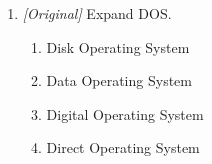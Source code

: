 \documentclass[11pt]{article}
\begin{document}
\begin{enumerate}[label=\textbf{Q\arabic*.}, leftmargin=*]
  correct?
  \begin{enumerate}[label=\Alph*.]
    \item It is system software that provides a user interface and manages
      the computer's resources.
    \item It is a hardware chip inside the CPU.
    \item It is application software for typing documents.
    \item It is the same thing as a device driver.
  \end{enumerate}
\item \textit{[Original]} Expand DOS.
  \begin{enumerate}[label=\Alph*.]
    \item Disk Operating System
    \item Data Operating System
    \item Digital Operating System
    \item Direct Operating System
  \end{enumerate}


\end{enumerate}
\end{document}
